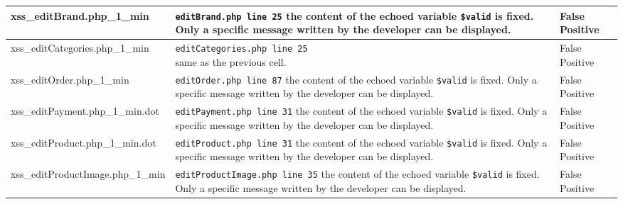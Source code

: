 \documentclass[11pt]{article}
\begin{document}
\begin{longtable}[H]{| p{} | p{} | p{} |}
	 	\hline
	  	xss\_editBrand.php\_1\_min 	
	  	& \makecell{ \texttt{editBrand.php line 25} \\
				 the content of the echoed variable \\
				 \texttt{\$valid} is fixed. Only a specific message\\
				  written by the developer can be displayed.}  
	 	& False Positive \\

	 	\hline
	  	xss\_editCategories.php\_1\_min 	
	  	& \makecell{ \texttt{editCategories.php line 25} \\
				 same as the previous cell.}  
	 	& False Positive \\

	 	\hline
	  	xss\_editOrder.php\_1\_min 	
	  	& \makecell{ \texttt{editOrder.php line 87} \\
				 the content of the echoed variable \\
				 \texttt{\$valid} is fixed. Only a specific message\\
				  written by the developer can be displayed.}  
	 	& False Positive \\

	 	\hline
	  	xss\_editPayment.php\_1\_min.dot 	
	  	& \makecell{ \texttt{editPayment.php line 31} \\
				 the content of the echoed variable \\
				 \texttt{\$valid} is fixed. Only a specific message\\
				  written by the developer can be displayed.}  
	 	& False Positive \\

	 	\hline
	  	xss\_editProduct.php\_1\_min.dot 	
	  	& \makecell{ \texttt{editProduct.php line 31} \\
				 the content of the echoed variable \\
				 \texttt{\$valid} is fixed. Only a specific message\\
				  written by the developer can be displayed.}  
	 	& False Positive \\
	 	
	 	\hline
	  	xss\_editProductImage.php\_1\_min 	
	  	& \makecell{ \texttt{editProductImage.php line 35} \\
				 the content of the echoed variable \\
				 \texttt{\$valid} is fixed. Only a specific message\\
				  written by the developer can be displayed.}  
	 	& False Positive \\
	 	

\end{longtable}
\end{document}
